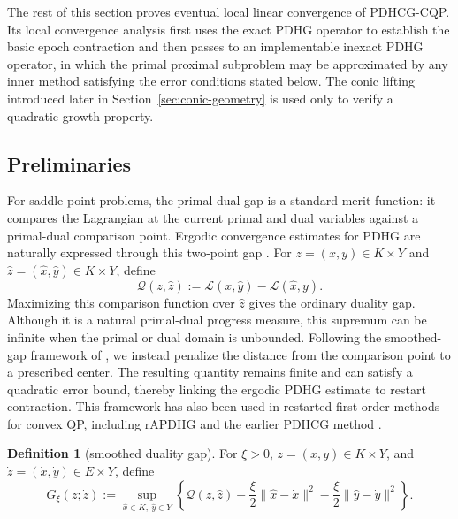 \documentclass[letterpaper]{article} %
\theoremstyle{definition}
\newtheorem{definition}[theorem]{Definition}
\theoremstyle{remark}
\begin{document}
The rest of this section proves eventual local linear convergence of
PDHCG-CQP.  Its local convergence analysis first uses the exact PDHG operator to
establish the basic epoch contraction and then passes to an implementable
inexact PDHG operator, in which the primal proximal subproblem may be approximated by
any inner method satisfying the error conditions stated below.  The conic
lifting introduced later in Section~\ref{sec:conic-geometry} is used only to
verify a quadratic-growth property.

\subsection{Preliminaries}

For saddle-point problems, the primal-dual gap is a standard merit function:
it compares the Lagrangian at the current primal and dual variables against a
primal-dual comparison point.  Ergodic convergence estimates for PDHG are
naturally expressed through this two-point gap
\cite{chambolle2011first}.  For $z=(x,y)\in K\times Y$ and
$\widehat z=(\widehat x,\widehat y)\in K\times Y$, define
\begin{equation}
\label{eq:ordinary-duality-gap}
    \mathcal Q(z,\widehat z)
    :=
    \mathcal L(x,\widehat y)-\mathcal L(\widehat x,y).
\end{equation}
Maximizing this comparison function over $\widehat z$ gives the ordinary
duality gap.  Although it is a natural primal-dual progress measure, this
supremum can be infinite when the primal or dual domain is unbounded.
Following the smoothed-gap framework of \cite{fercoq2022quadratic}, we
instead penalize the distance from the comparison point to a prescribed
center.  The resulting quantity remains finite and can satisfy a quadratic
error bound, thereby linking the ergodic PDHG estimate to restart
contraction.  This framework has also been used in restarted first-order
methods for convex QP, including rAPDHG and the earlier PDHCG method
\cite{lu2023practical,huang2025restarted}.

\begin{definition}[smoothed duality gap]
\label{def:smoothed-gap}
For $\xi>0$, $z=(x,y)\in K\times Y$, and
$\dot z=(\dot x,\dot y)\in E\times Y$, define
\begin{equation}
\label{eq:smoothed-gap}
    G_\xi(z;\dot z)
    :=
    \sup_{\widehat x\in K,\ \widehat y\in Y}
    \left\{
        \mathcal Q(z,\widehat z)
        -\frac{\xi}{2}\|\widehat x-\dot x\|^2
        -\frac{\xi}{2}\|\widehat y-\dot y\|^2
    \right\}.
\end{equation}
\end{definition}
\end{document}
